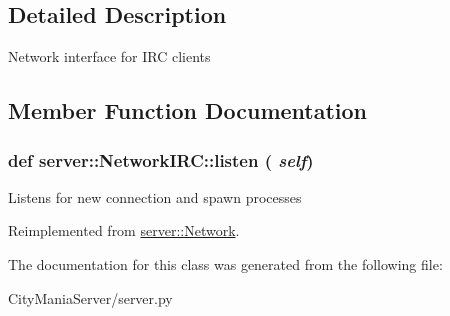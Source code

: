 \subsection{Detailed Description}
\begin{DoxyVerb}
Network interface for IRC clients
\end{DoxyVerb}
 

\subsection{Member Function Documentation}
\hypertarget{classserver_1_1NetworkIRC_ae45074cb1b23332c54b323d5304d5512}{
\subsubsection[{listen}]{\setlength{\rightskip}{0pt plus 5cm}def server::NetworkIRC::listen ( {\em self})}}
\label{classserver_1_1NetworkIRC_ae45074cb1b23332c54b323d5304d5512}
\begin{DoxyVerb}
Listens for new connection and spawn processes
\end{DoxyVerb}
 

Reimplemented from \hyperlink{classserver_1_1Network_a981b8652a76e0bba27263690fcdf9a62}{server::Network}.

The documentation for this class was generated from the following file:\begin{DoxyCompactItemize}
\item 
CityManiaServer/server.py\end{DoxyCompactItemize}
